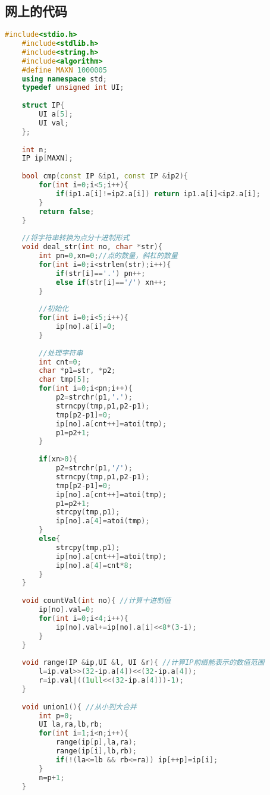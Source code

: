 \subsection{网上的代码}
\begin{lstlisting}[language=C++]
    #include<stdio.h>
    #include<stdlib.h>
    #include<string.h>
    #include<algorithm> 
    #define MAXN 1000005
    using namespace std;
    typedef unsigned int UI;
    
    struct IP{
        UI a[5];
        UI val;
    };
    
    int n;
    IP ip[MAXN];
    
    bool cmp(const IP &ip1, const IP &ip2){
        for(int i=0;i<5;i++){
            if(ip1.a[i]!=ip2.a[i]) return ip1.a[i]<ip2.a[i];
        }
        return false;
    }
    
    //将字符串转换为点分十进制形式 
    void deal_str(int no, char *str){
        int pn=0,xn=0;//点的数量，斜杠的数量 
        for(int i=0;i<strlen(str);i++){
            if(str[i]=='.') pn++;
            else if(str[i]=='/') xn++; 
        }
        
        //初始化
        for(int i=0;i<5;i++){
            ip[no].a[i]=0;
        }
        
        //处理字符串 
        int cnt=0;
        char *p1=str, *p2;
        char tmp[5];
        for(int i=0;i<pn;i++){
            p2=strchr(p1,'.');
            strncpy(tmp,p1,p2-p1);
            tmp[p2-p1]=0;
            ip[no].a[cnt++]=atoi(tmp);
            p1=p2+1;
        }
        
        if(xn>0){
            p2=strchr(p1,'/');
            strncpy(tmp,p1,p2-p1);
            tmp[p2-p1]=0;
            ip[no].a[cnt++]=atoi(tmp);
            p1=p2+1;
            strcpy(tmp,p1);
            ip[no].a[4]=atoi(tmp); 
        }
        else{
            strcpy(tmp,p1);
            ip[no].a[cnt++]=atoi(tmp);
            ip[no].a[4]=cnt*8; 
        }
    }
    
    void countVal(int no){ //计算十进制值 
        ip[no].val=0;
        for(int i=0;i<4;i++){
            ip[no].val+=ip[no].a[i]<<8*(3-i);
        }
    }
    
    void range(IP &ip,UI &l, UI &r){ //计算IP前缀能表示的数值范围 
        l=ip.val>>(32-ip.a[4])<<(32-ip.a[4]);
        r=ip.val|((1ull<<(32-ip.a[4]))-1);
    }
    
    void union1(){ //从小到大合并 
        int p=0;
        UI la,ra,lb,rb;
        for(int i=1;i<n;i++){
            range(ip[p],la,ra);
            range(ip[i],lb,rb);
            if(!(la<=lb && rb<=ra)) ip[++p]=ip[i];
        }
        n=p+1; 
    }
    

\end{lstlisting}
